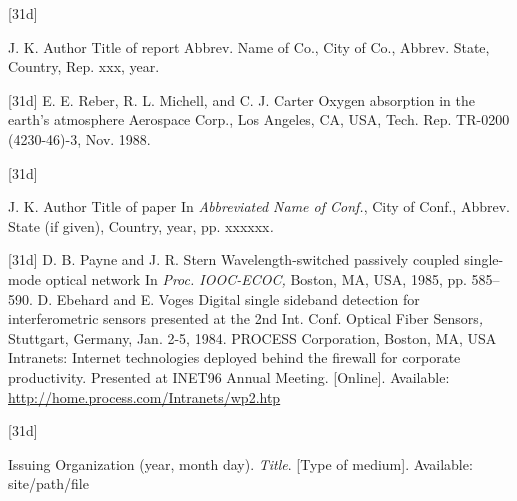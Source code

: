 \documentclass[letter]{IEEEtaes}
\begin{document}
\vspace*{-12pt}

\begin{thebibliography}{[31d]}
\item[]  J. K. Author
\newblock Title of report
\newblock Abbrev. Name of Co., City of Co., Abbrev. State, Country, Rep. xxx, year.
\end{thebibliography}

\vspace*{-12pt}
\begin{thebibliography}{[31d]}
\setcounter{enumiv}{12}
E. E. Reber, R. L. Michell, and C. J. Carter
\newblock Oxygen absorption in the earth's atmosphere
\newblock Aerospace Corp., Los Angeles, CA, USA, Tech. Rep. TR-0200 (4230-46)-3, Nov. 1988.
\end{thebibliography}

\vspace*{-12pt}
\begin{thebibliography}{[31d]}
\item[] J. K. Author
\newblock Title of paper
\newblock In \emph{Abbreviated Name of Conf.}, City of Conf., Abbrev. State (if given), Country, year, pp. xxxxxx\emph{.}
\end{thebibliography}

\vspace*{-12pt}
\begin{thebibliography}{[31d]}
\setcounter{enumiv}{13}
D. B. Payne and J. R. Stern
\newblock Wavelength-switched passively coupled single-mode optical network
\newblock In \emph{Proc. IOOC-ECOC,} Boston, MA, USA, 1985, pp. 585--590.
D. Ebehard and E. Voges
\newblock Digital single sideband detection for interferometric sensors
\newblock presented at the 2nd Int. Conf. Optical Fiber Sensors\emph{,} Stuttgart, Germany, Jan. 2-5, 1984.
PROCESS Corporation, Boston, MA, USA
\newblock Intranets: Internet technologies deployed behind the firewall for corporate productivity. Presented at INET96 Annual Meeting. {[}Online{]}. Available: \href{http://home.process.com/Intranets/wp2.htp}{\url{http://home.process.com/Intranets/wp2.htp}}
\end{thebibliography}

\vspace*{-12pt}
\begin{thebibliography}{[31d]}
\item[] Issuing Organization
\newblock (year, month day). \emph{Title}. {[}Type of medium{]}. Available: site/path/file
\end{thebibliography}
\end{document}
